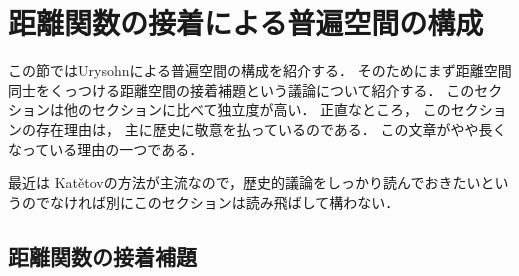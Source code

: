 \documentclass[leqno, 12pt]{jsarticle}
\begin{document}

\newpage
\section{距離関数の接着による普遍空間の構成}\label{sec:sechaku}
この節ではUrysohnによる普遍空間の構成を紹介する．
そのためにまず距離空間同士をくっつける距離空間の接着補題という議論について紹介する．
このセクションは他のセクションに比べて独立度が高い．
正直なところ，
このセクションの存在理由は，
主に歴史に敬意を払っているのである．
この文章がやや長くなっている理由の一つである．



最近は
Kat\v{e}tovの方法が主流なので，歴史的議論をしっかり読んでおきたいというのでなければ別にこのセクションは読み飛ばして構わない．
\subsection{距離関数の接着補題}
\end{document}
